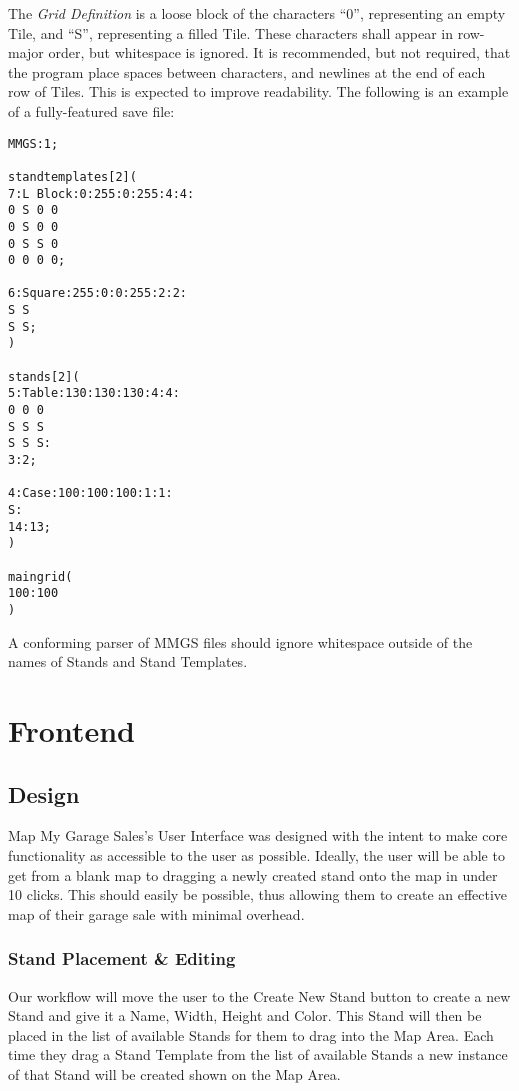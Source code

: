 \documentclass{report}
\begin{document}
The \emph{Grid Definition} is a loose block of the characters ``0'',
representing an empty Tile, and ``S'', representing a filled Tile.
These characters shall appear in row-major order, but whitespace is ignored.
It is recommended, but not required, that the program place spaces between
characters, and newlines at the end of each row of Tiles. This is expected to
improve readability.
\newpage
The following is an example of a fully-featured save file:
\begin{verbatim}
MMGS:1;

standtemplates[2](
7:L Block:0:255:0:255:4:4:
0 S 0 0
0 S 0 0
0 S S 0
0 0 0 0;

6:Square:255:0:0:255:2:2:
S S
S S;
)

stands[2](
5:Table:130:130:130:4:4:
0 0 0
S S S
S S S:
3:2;

4:Case:100:100:100:1:1:
S:
14:13;
)

maingrid(
100:100
)
\end{verbatim}

A conforming parser of MMGS files should ignore whitespace outside of the
names of Stands and Stand Templates.

\chapter{Frontend}

\section{Design}
Map My Garage Sales's User Interface was designed with the intent to make core
 functionality as accessible to the user as possible.  Ideally, the user will be able to 
get from a blank map to dragging a newly created stand onto the map in under 10 
clicks.  This should easily be possible, thus allowing them to create an effective map 
of their garage sale with minimal overhead.  

\subsection{Stand Placement \& Editing}
Our workflow will move the user to the Create New Stand button to create a new 
Stand and give it a Name, Width, Height and Color.  This Stand will then be placed
 in the list of available Stands for them to drag into the Map Area.  Each time they 
drag a Stand Template from the list of available Stands a new instance of that Stand 
will be created shown on the Map Area.
\end{document}
